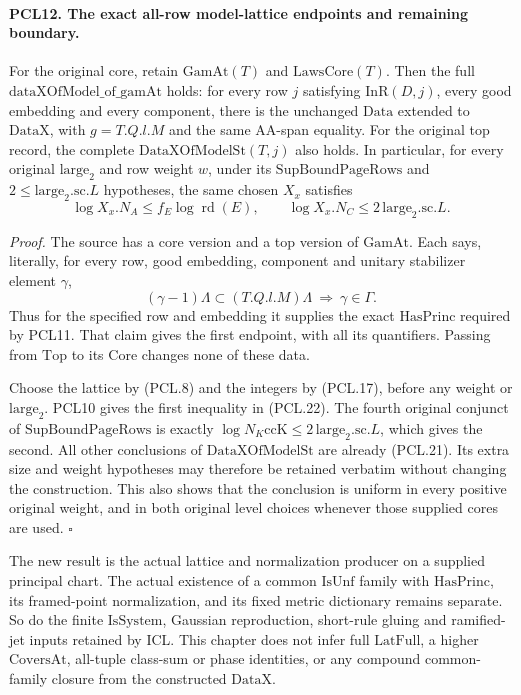 \paragraph{PCL12. The exact all-row model-lattice endpoints and remaining boundary.}
\label{claim:PCL12}
For the original core, retain \(\mathrm{GamAt}(T)\) and
\(\mathrm{LawsCore}(T)\).  Then the full
\(\mathrm{dataXOfModel\_of\_gamAt}\) holds: for every
row \(j\) satisfying \(\mathrm{InR}(D,j)\), every good
embedding and every component, there is
the unchanged \(\mathrm{Data}\) extended to \(\mathrm{DataX}\),
with \(g=T.Q.l.M\) and the same \(\mathrm{AA}\)-span equality.
For the original top record, the complete
\(\mathrm{DataXOfModelSt}(T,j)\) also holds.  In particular,
for every original \(\mathrm{large}_2\) and row weight \(w\),
under its \(\mathrm{SupBoundPageRows}\) and
\(2\le\mathrm{large}_2.\mathrm{sc}.L\) hypotheses, the
same chosen \(X_x\) satisfies
\[
 \log X_x.N_A\le f_E\log\operatorname{rd}(E),\qquad
 \log X_x.N_C\le2\,\mathrm{large}_2.\mathrm{sc}.L.     \tag{PCL.22}
\]

\emph{Proof.}
The source has a core version and a top version of
\(\mathrm{GamAt}\).  Each says, literally, for every
row, good embedding, component and unitary stabilizer
element \(\gamma\),
\[
       (\gamma-1)\Lambda\subset (T.Q.l.M)\Lambda
                      \ \Longrightarrow\ \gamma\in\Gamma.
                                                               \tag{PCL.23}
\]
Thus for the specified row and embedding it supplies
the exact \(\mathrm{HasPrinc}\) required by PCL11.
That claim gives the first endpoint, with all its
quantifiers.  Passing from \(\mathrm{Top}\) to its
\(\mathrm{Core}\) changes none of these data.

Choose the lattice by (PCL.8) and the integers by
(PCL.17), before any weight or \(\mathrm{large}_2\).
PCL10 gives the first inequality in (PCL.22).
The fourth original conjunct of
\(\mathrm{SupBoundPageRows}\) is exactly
\(\log N_K\mathrm{ccK}\le2\,\mathrm{large}_2.\mathrm{sc}.L\),
which gives the second.  All other conclusions of
\(\mathrm{DataXOfModelSt}\) are already (PCL.21).
Its extra size and weight hypotheses may therefore
be retained verbatim without changing the construction.
This also shows that the conclusion is uniform in
every positive original weight, and in both original
level choices whenever those supplied cores are used.
\hfill\(\square\)

The new result is the actual lattice and normalization
producer on a supplied principal chart.  The actual
existence of a common \(\mathrm{IsUnf}\) family with
\(\mathrm{HasPrinc}\), its framed-point normalization,
and its fixed metric dictionary remains separate.
So do the finite \(\mathrm{IsSystem}\), Gaussian
reproduction, short-rule gluing and ramified-jet inputs
retained by ICL.  This chapter does not infer full
\(\mathrm{LatFull}\), a higher \(\mathrm{CoversAt}\),
all-tuple class-sum or phase identities, or any compound
common-family closure from the constructed \(\mathrm{DataX}\).
